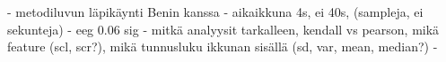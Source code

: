  - metodiluvun läpikäynti Benin kanssa
 - aikaikkuna 4s, ei 40s, (sampleja, ei sekunteja)
 - eeg 0.06 sig
 - mitkä analyysit tarkalleen, kendall vs pearson, mikä feature (scl, scr?), mikä tunnusluku ikkunan sisällä (sd, var, mean, median?)
 - 